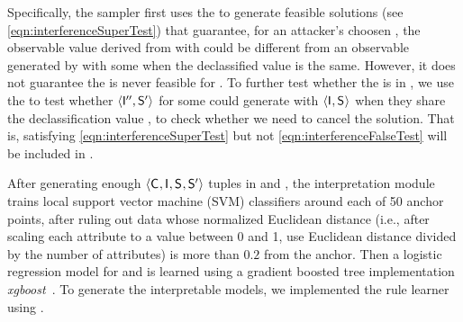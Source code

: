 Specifically, the sampler first uses the \interferenceSuperTest to
generate feasible solutions \sampleTuple (see
\eqref{eqn:interferenceSuperTest}) that guarantee, for an attacker's
choosen \ACIFn{}, the observable value \AOOFn{} derived from \SecFn{}
with \AIIFn{} could be different from an observable \AOOFnAlt{}
generated by \SecFnAlt{} with some \AIIFnAlt{}
when the declassified value \DCFn{} is the same.  However, it does not
guarantee the \AOOFn{} is never feasible for \SecFn{}. To further test
whether the \sampleTuple is in \interferenceSetSamples, we use the
\interferenceFalseTest to test whether
$\langle\mathsf{I}''_{}, \mathsf{S}'_{}\rangle$ for some \AIIFnAltAlt{}
could generate \AOOFn{} with $\langle\mathsf{I}_{},\mathsf{S}_{}\rangle$ when
they share the declassification value \DCFn{}, to check whether we
need to cancel the solution.  That is, \sampleTuple satisfying
\eqref{eqn:interferenceSuperTest} but not
\eqref{eqn:interferenceFalseTest} will be included in
\interferenceSetSamples{}.

After generating enough $\langle\mathsf{C}_{},\mathsf{I}_{},\mathsf{S}_{},\mathsf{S}'_{}\rangle$ tuples in
\noninterferenceSetSamples and \interferenceSetSamples, the
interpretation module trains local support vector machine (SVM)
classifiers \cite{fan2008liblinear} around each of 50 anchor points,
after ruling out data whose normalized Euclidean distance (i.e., after
scaling each attribute to a value between 0 and 1, use Euclidean
distance divided by the number of attributes) is more than $0.2$ from
the anchor.
Then a logistic regression model for \noninterferenceSet and
\interferenceSet is learned using a gradient boosted tree
implementation \textit{xgboost}~\cite{chen2016xgboost}. To generate the
interpretable models, we implemented the rule learner using \SkopeRule.

